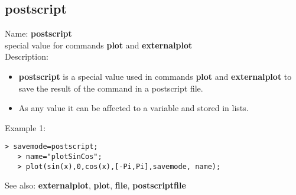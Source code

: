 \subsection{ postscript }
\noindent Name: \textbf{postscript}\\
special value for commands \textbf{plot} and \textbf{externalplot}\\

\noindent Description: \begin{itemize}

\item \textbf{postscript} is a special value used in commands \textbf{plot} and \textbf{externalplot} to save
   the result of the command in a postscript file.

\item As any value it can be affected to a variable and stored in lists.
\end{itemize}
\noindent Example 1: 
\begin{center}\begin{minipage}{14.8cm}\begin{Verbatim}[frame=single]
   > savemode=postscript;
   > name="plotSinCos";
   > plot(sin(x),0,cos(x),[-Pi,Pi],savemode, name);
\end{Verbatim}
\end{minipage}\end{center}
See also: \textbf{externalplot}, \textbf{plot}, \textbf{file}, \textbf{postscriptfile}
